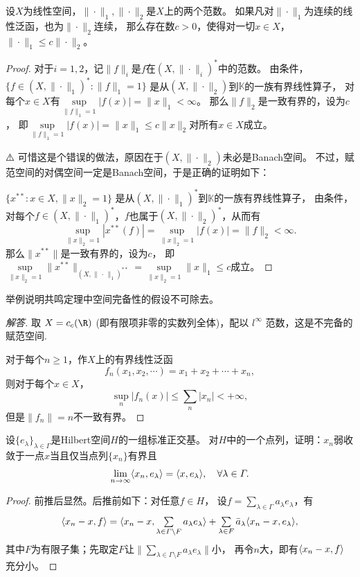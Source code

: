 \begin{15}
    设$X$为线性空间，$\|\cdot\|_1,\|\cdot\|_2$是$X$上的两个范数。
    如果凡对$\|\cdot\|_1$为连续的线性泛函，也为$\|\cdot\|_2$连续，
    那么存在数$c>0$，使得对一切$x\in X$，$\|\cdot\|_1\leqslant c\|\cdot\|_2$。
\end{15}
\begin{proof}
    对于$i=1,2$，记$\|f\|_i$是$f$在$(X,\|\cdot\|_i)^*$中的范数。
    由条件，$\{f\in(X,\|\cdot\|_1)^*:\|f\|_1=1\}$
    是从$(X,\|\cdot\|_2)$到$\mathbb{K}$的一族有界线性算子，
    对每个$x\in X$有$\sup\limits_{\|f\|_1=1}|f(x)|=\|x\|_1<\infty$。
    那么$\|f\|_2$是一致有界的，设为$c$，
    即$\sup\limits_{\|f\|_1=1}|f(x)|=\|x\|_1\leqslant c\|x\|_2$对所有$x\in X$成立。

    ⚠️ 可惜这是个错误的做法，原因在于$(X,\|\cdot\|_2)$未必是Banach空间。
    不过，赋范空间的对偶空间一定是Banach空间，于是正确的证明如下：

    $\{x^{**}:x \in X,\|x\|_2=1\}$
    是从$(X,\|\cdot\|_1)^*$到$\mathbb{K}$的一族有界线性算子，
    由条件，对每个$f\in(X,\|\cdot\|_1)^*$，$f$也属于$(X,\|\cdot\|_2)^*$，从而有
    \[\sup_{\|x\|_2=1}|x^{**}(f)|=\sup_{\|x\|_2=1}|f(x)|=\|f\|_2<\infty.\]
    那么$\|x^{**}\|$是一致有界的，设为$c$，
    即$\sup\limits_{\|x\|_2=1}\|x^{**}\|_{(X,\|\,\cdot\,\|_1)^{**}}
    =\sup\limits_{\|x\|_2=1}\|x\|_1\leqslant c$成立。
\end{proof}

\begin{16}
    举例说明共鸣定理中空间完备性的假设不可除去。
\end{16}
\begin{proof}[解答]
    取 $X=c_c(\R)$ (即有限项非零的实数列全体)，配以 $l^\infty$ 范数，这是不完备的赋范空间.
    
    对于每个$n \geqslant 1$，作$X$上的有界线性泛函
    \[f_n(x_1,x_2,\cdots)=x_1+x_2+\cdots+x_n,\]
    则对于每个$x\in X$，
    \[\sup_n|f_n(x)|\leqslant\sum_n|x_n|<+\infty,\]
    但是$\|f_n\|=n$不一致有界。
\end{proof}

\begin{17}
    设$\{e_\lambda\}_{\lambda\in\varGamma}$是Hilbert空间$H$的一组标准正交基。
    对$H$中的一个点列，证明：$x_n$弱收敛于一点$x$当且仅当点列$\{x_n\}$有界且
    \[\lim_{n\to\infty}\langle x_n,e_\lambda \rangle=\langle x,e_\lambda \rangle,
    \quad\forall\lambda\in\varGamma.\]
\end{17}
\begin{proof}
    前推后显然。后推前如下：对任意$f \in H$，
    设$f=\sum\limits_{\lambda\in\varGamma}a_\lambda e_\lambda$，有
    \[\textstyle\langle x_n-x,f \rangle=\langle x_n-x,\sum\limits_{\lambda\in\varGamma \setminus F}a_\lambda e_\lambda \rangle
    +\sum\limits_{\lambda \in F}\bar{a}_\lambda\langle x_n-x,e_\lambda \rangle,\]
    其中$F$为有限子集；先取定$F$让$\Big\|\sum\limits_{\lambda\in\varGamma \setminus F}a_\lambda e_\lambda\Big\|$小，
    再令$n$大，即有$\langle x_n-x,f \rangle$充分小。
\end{proof}

